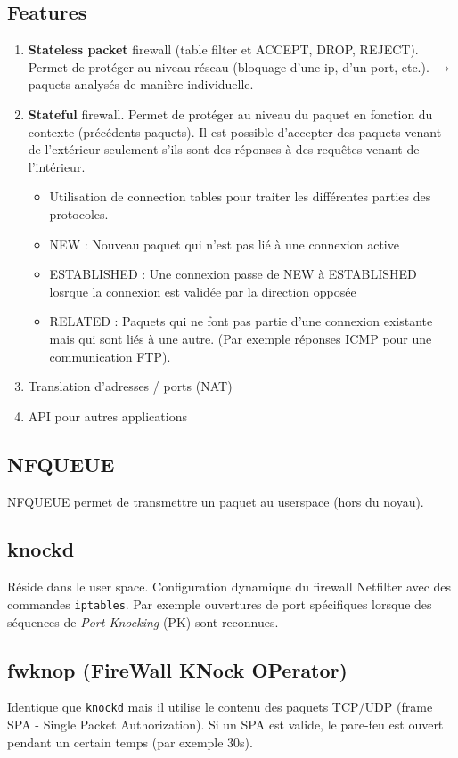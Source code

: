 \subsection{Features}
\begin{enumerate}
    \item \textbf{Stateless packet} firewall (table filter et ACCEPT, DROP, REJECT). Permet de protéger au niveau réseau (bloquage d'une ip, d'un port, etc.). $\rightarrow$ paquets analysés de manière individuelle.
    \item \textbf{Stateful} firewall. Permet de protéger au niveau du paquet en fonction du contexte (précédents paquets). Il est possible d'accepter des paquets venant de l'extérieur seulement s'ils sont des réponses à des requêtes venant de l'intérieur.
    \begin{itemize}
        \item Utilisation de connection tables pour traiter les différentes parties des protocoles.
        \item NEW : Nouveau paquet qui n'est pas lié à une connexion active
        \item ESTABLISHED : Une connexion passe de NEW à ESTABLISHED losrque la connexion est validée par la direction opposée
        \item RELATED : Paquets qui ne font pas partie d'une connexion existante mais qui sont liés à une autre. (Par exemple réponses ICMP pour une communication FTP).
    \end{itemize}
    \item Translation d'adresses / ports (NAT)
    \item API pour autres applications
\end{enumerate}
\subsection{NFQUEUE}
NFQUEUE permet de transmettre un paquet au userspace (hors du noyau).
\subsection{knockd}
Réside dans le user space. Configuration dynamique du firewall Netfilter avec des commandes \verb!iptables!. Par exemple ouvertures de port spécifiques lorsque des séquences de \textit{Port Knocking} (PK) sont reconnues.
\subsection{fwknop (FireWall KNock OPerator)}
Identique que \verb+knockd+ mais il utilise le contenu des paquets TCP/UDP (frame SPA - Single Packet Authorization). Si un SPA est valide, le pare-feu est ouvert pendant un certain temps (par exemple 30s).
